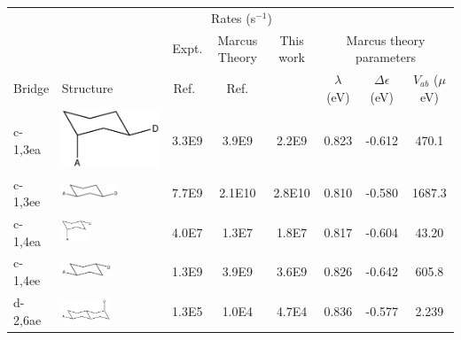 \begin{table}[t]
\begin{centering}
\begin{tabular}{llccc|ccc}
\hline \hline
 & & \multicolumn{3}{c}{Rates (s$^{-1}$) }& \\
                &                                                                &   Expt.                 &        Marcus Theory   & This work      & \multicolumn{3}{c}{Marcus theory parameters} \\
 Bridge   &  Structure                                                &        Ref.~\cite{closs1988determination,closs1989connection} &              Ref. \cite{Subotnik:2010}  &                  &      $\lambda$ (eV)  &  $\Delta \epsilon$ (eV)  &  $V_{ab}$ ($\mu$eV) \\
\hline
 c-1,3ea  &  \includegraphics[height=.60cm]{Chapters/chap2/Table1-c13ea.pdf}  &                     3.3E9  &                     3.9E9  &          2.2E9  &           0.823  &           -0.612  &      470.1  \\
\hline
 c-1,3ee  &  \includegraphics[height=0.4cm]{Chapters/chap2/Table1-c13ee.pdf}  &                     7.7E9  &                    2.1E10  &         2.8E10  &           0.810  &           -0.580  &     1687.3  \\
\hline
 c-1,4ea  &  \includegraphics[height=0.6cm]{Chapters/chap2/Table1-c14ea.pdf}  &                     4.0E7  &                     1.3E7  &          1.8E7  &           0.817  &           -0.604  &      43.20 \\
\hline
 c-1,4ee  &  \includegraphics[height=0.4cm]{Chapters/chap2/Table1-c14ee.pdf}  &                     1.3E9  &                     3.9E9  &          3.6E9  &           0.826  &           -0.642  &      605.8  \\
\hline
 d-2,6ae  &  \includegraphics[height=0.6cm]{Chapters/chap2/Table1-d26ae.pdf}  &                     1.3E5  &                     1.0E4  &          4.7E4  &           0.836  &           -0.577  &    2.239  \\

\end{tabular}
\end{centering}
\end{table}
